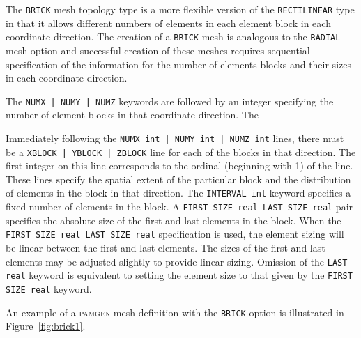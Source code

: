 The \texttt{BRICK} mesh topology type is a more flexible version of the \texttt{RECTILINEAR} type in that it allows different numbers of elements in each element block in each coordinate direction. The creation of a
\texttt{BRICK} mesh is analogous to the \texttt{RADIAL} mesh option
and
successful creation of these meshes requires sequential
specification of the information for the number of elements blocks and
their sizes in each coordinate direction.

The \texttt{NUMX | NUMY | NUMZ} keywords are followed by an integer
specifying the number
of element blocks in that coordinate direction. The

Immediately following
the \texttt{NUMX int | NUMY int | NUMZ int} lines, there must be a \texttt{XBLOCK |
  YBLOCK | ZBLOCK} line for each of the blocks in that direction. The first integer on  this line corresponds to the ordinal (beginning with 1) of the line.
These lines specify the spatial extent of the particular block and the
distribution of elements in the block in that direction. The \texttt{INTERVAL int} keyword
specifies a fixed number of elements in the
block. A \texttt{FIRST SIZE real LAST SIZE real} pair specifies the absolute
size of the first and last elements in the block. When the \texttt{FIRST SIZE real LAST SIZE real} specification is
used, the element sizing will be linear between the first and last
elements. The sizes of the first and last elements may be
adjusted slightly to provide linear sizing. Omission of the
\texttt{LAST real} keyword is equivalent to setting the element size
to that given by the \texttt{FIRST SIZE real} keyword.


An example of a \textsc{pamgen} mesh definition with the
\texttt{BRICK} option is illustrated in
Figure~\ref{fig:brick1}.


